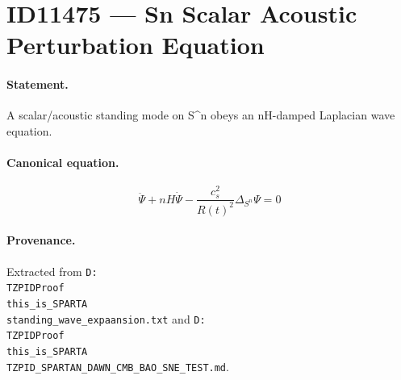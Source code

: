 \section*{ID11475 --- Sn Scalar Acoustic Perturbation Equation}

\paragraph{Statement.}
A scalar/acoustic standing mode on S^n obeys an nH-damped Laplacian wave equation.

\paragraph{Canonical equation.}
\[
\ddot\Psi+nH\dot\Psi-\frac{c_s^2}{R(t)^2}\Delta_{S^n}\Psi=0
\]

\paragraph{Provenance.}
Extracted from \texttt{D:\\TZPIDProof\\this\_is\_SPARTA\\standing\_wave\_expaansion.txt} and \texttt{D:\\TZPIDProof\\this\_is\_SPARTA\\TZPID\_SPARTAN\_DAWN\_CMB\_BAO\_SNE\_TEST.md}.
